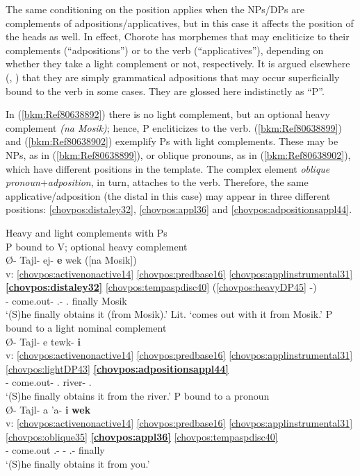 \documentclass[output=paper]{langscibook}
\begin{document}
The same conditioning on the position applies when the NPs/DPs are complements of adpositions/applicatives, but in this case it affects the position of the heads as well. In effect, Chorote has morphemes that may encliticize to their complements (``adpositions'') or to the verb (``applicatives''), depending on whether they take a light complement or not, respectively. It is argued elsewhere (\citealt{Carol2011b}, \citealt{CarolSalanova2012}) that they are simply grammatical adpositions that may occur superficially bound to the verb in some cases. They are glossed here indistinctly as ``P''.

In (\ref{bkm:Ref80638892}) there is no light complement, but an optional heavy complement \textit{(na Mosik)}; hence, P encliticizes to the verb. (\ref{bkm:Ref80638899}) and (\ref{bkm:Ref80638902}) exemplify Ps with light complements. These may be NPs, as in (\ref{bkm:Ref80638899}), or oblique pronouns, as in (\ref{bkm:Ref80638902}), which have different positions in the template. The complex element \textit{oblique pronoun}+\textit{adposition}, in turn, attaches to the verb. Therefore, the same applicative/adposition (the distal in this case) may appear in three different positions: \ref{chovpos:distaley32}, \ref{chovpos:appl36} and \ref{chovpos:adpositionsappl44}.


\ea\label{ex:chor:key:2}Heavy and light complements with Ps \\ 
    \ea\label{bkm:Ref80638892}P bound to V; optional heavy complement \\ {
    \glll {} Ø- Tajl- ej- \textbf{e} wek ([na Mosik])\\ 
    v: \ref{chovpos:activenonactive14} \ref{chovpos:predbase16} \ref{chovpos:applinstrumental31} \textbf{\ref{chovpos:distaley32}} \ref{chovpos:tempaspdisc40} (\ref{chovpos:heavyDP45} -)\\
    {} \Third{}- come.out- \Ap.\Ins{}- \Ap.\Dist{} finally \Dem{} Mosik\\ 
    \glt {} `(S)he finally obtains it (from Mosik).' Lit. `comes out with it from Mosik.'
    }
    \ex\label{bkm:Ref80638899}P bound to a light nominal complement \\ {
    \glll {} Ø- Tajl- e tewk- \textbf{i}\\ 
    v: \ref{chovpos:activenonactive14} \ref{chovpos:predbase16} \ref{chovpos:applinstrumental31}  \ref{chovpos:lightDP43} \textbf{\ref{chovpos:adpositionsappl44}}\\ 
    {} \Third{}- come.out- \Ap.\Ins{} river- \Ap.\Dist{}\\
    \glt `(S)he finally obtains it from the river.'
    }
    \ex\label{bkm:Ref80638902} P bound to a pronoun\\ {
    \glll {} Ø- Tajl- a 'a- \textbf{i} \textbf{wek}\\ 
    v: \ref{chovpos:activenonactive14} \ref{chovpos:predbase16} \ref{chovpos:applinstrumental31} \ref{chovpos:oblique35} \textbf{\ref{chovpos:appl36}} \ref{chovpos:tempaspdisc40}\\ 
   {}  \Third{}- come.out \Ap.\Ins{}- \Second{}- \Ap.\Dist{}-   finally \\
    \glt`(S)he finally obtains it from you.'
    }
    \z 
\z 
\end{document}
